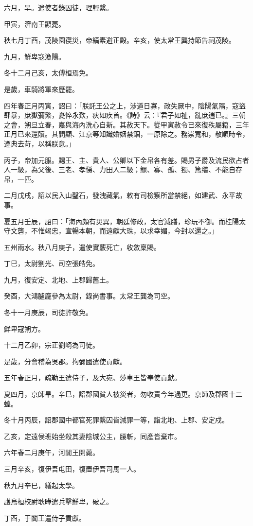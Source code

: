 \begin{pinyinscope}
六月，旱。遣使者錄囚徒，理輕繫。

甲寅，濟南王顯薨。

秋七月丁酉，茂陵園寑災，帝縞素避正殿。辛亥，使太常王龔持節告祠茂陵。

九月，鮮卑寇漁陽。

冬十二月己亥，太傅桓焉免。

是歲，車騎將軍來歷罷。

四年春正月丙寅，詔曰：「朕託王公之上，涉道日寡，政失厥中，陰陽氣隔，寇盜肆暴，庶獄彌繁，憂悴永歎，疢如疾首。《詩》云：『君子如祉，亂庶遄已。』三朝之會，朔旦立春，嘉與海內洗心自新。其赦天下。從甲寅赦令已來復秩屬籍，三年正月已來還贖。其閻顯、江京等知識婚姻禁錮，一原除之。務崇寬和，敬順時令，遵典去苛，以稱朕意。」

丙子，帝加元服。賜王、主、貴人、公卿以下金帛各有差。賜男子爵及流民欲占者人一級，為父後、三老、孝悌、力田人二級；鰥、寡、孤、獨、篤缮、不能自存帛，一匹。

二月戊戌，詔以民入山鑿石，發洩藏氣，敕有司檢察所當禁絕，如建武、永平故事。

夏五月壬辰，詔曰：「海內頗有災異，朝廷修政，太官減膳，珍玩不御。而桂陽太守文礱，不惟竭忠，宣暢本朝，而遠獻大珠，以求幸媚，今封以還之。」

五州雨水。秋八月庚子，遣使實覈死亡，收斂稟賜。

丁巳，太尉劉光、司空張皓免。

九月，復安定、北地、上郡歸舊土。

癸酉，大鴻臚龐參為太尉，錄尚書事。太常王龔為司空。

冬十一月庚辰，司徒許敬免。

鮮卑寇朔方。

十二月乙卯，宗正劉崎為司徒。

是歲，分會稽為吳郡。拘彌國遣使貢獻。

五年春正月，疏勒王遣侍子，及大宛、莎車王皆奉使貢獻。

夏四月，京師旱。辛巳，詔郡國貧人被災者，勿收責今年過更。京師及郡國十二蝗。

冬十月丙辰，詔郡國中都官死罪繫囚皆減罪一等，詣北地、上郡、安定戍。

乙亥，定遠侯班始坐殺其妻陰城公主，腰斬，同產皆棄市。

六年春二月庚午，河閒王開薨。

三月辛亥，復伊吾屯田，復置伊吾司馬一人。

秋九月辛巳，繕起太學。

護烏桓校尉耿曄遣兵擊鮮卑，破之。

丁酉，于闐王遣侍子貢獻。


\end{pinyinscope}
